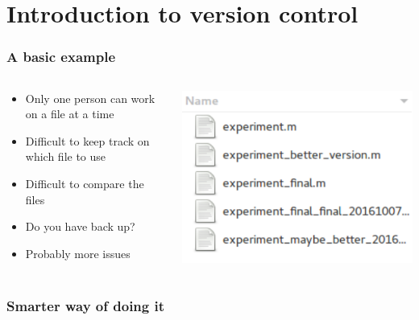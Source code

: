 \section[Introduction]{Introduction to version control}
\begin{frame}
	\frametitle{A basic example}
	\begin{columns}
		\begin{column}{0.5\textwidth}
		\begin{itemize}[<+->]
			\item Only one person can work on a file at a time
			\item Difficult to keep track on which file to use
			\item Difficult to compare the files
			\item Do you have back up?
			\item Probably more issues
		\end{itemize}
		\end{column}
		\begin{column}{0.5\textwidth}
			\begin{center}
				\includegraphics[width=\textwidth]{./pictures/simple.pdf}
			\end{center}
		\end{column}
	\end{columns}
\end{frame}

\begin{frame}
	\frametitle{Smarter way of doing it}
\end{frame}
